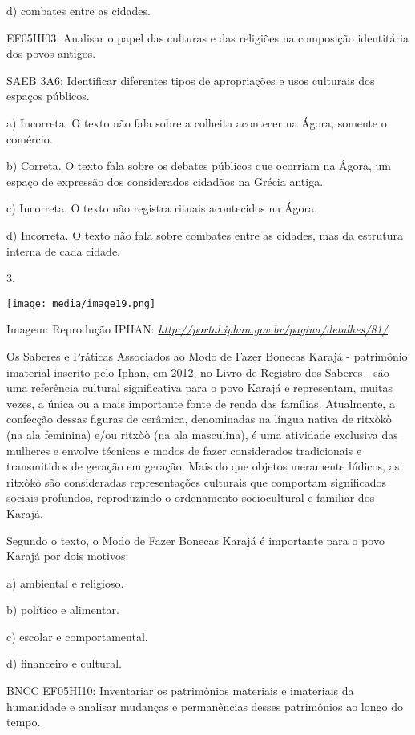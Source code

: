 d) combates entre as cidades.

EF05HI03: Analisar o papel das culturas e das religiões na composição
identitária dos povos antigos.

SAEB 3A6: Identificar diferentes tipos de apropriações e usos culturais
dos espaços públicos.

a) Incorreta. O texto não fala sobre a colheita acontecer na Ágora,
somente o comércio.

b) Correta. O texto fala sobre os debates públicos que ocorriam na
Ágora, um espaço de expressão dos considerados cidadãos na Grécia
antiga.

c) Incorreta. O texto não registra rituais acontecidos na Ágora.

d) Incorreta. O texto não fala sobre combates entre as cidades, mas da
estrutura interna de cada cidade.

3.

\texttt{[image: media/image19.png]}

Imagem: Reprodução IPHAN:
\href{http://portal.iphan.gov.br/pagina/detalhes/81/}{\emph{http://portal.iphan.gov.br/pagina/detalhes/81/}}

Os Saberes e Práticas Associados ao Modo de Fazer Bonecas Karajá -
patrimônio imaterial inscrito pelo Iphan, em 2012, no Livro de Registro
dos Saberes - são uma referência cultural significativa para o povo
Karajá e representam, muitas vezes, a única ou a mais importante fonte
de renda das famílias. Atualmente, a confecção dessas figuras de
cerâmica, denominadas na língua nativa de ritxòkò (na ala feminina) e/ou
ritxòò (na ala masculina), é uma atividade exclusiva das mulheres e
envolve técnicas e modos de fazer considerados tradicionais e
transmitidos de geração em geração. Mais do que objetos meramente
lúdicos, as ritxòkò são consideradas representações culturais que
comportam significados sociais profundos, reproduzindo o ordenamento
sociocultural e familiar dos Karajá.

Segundo o texto, o Modo de Fazer Bonecas Karajá é importante para o povo
Karajá por dois motivos:

a) ambiental e religioso.

b) político e alimentar.

c) escolar e comportamental.

d) financeiro e cultural.

BNCC EF05HI10: Inventariar os patrimônios materiais e imateriais da
humanidade e analisar mudanças e permanências desses patrimônios ao
longo do tempo.

